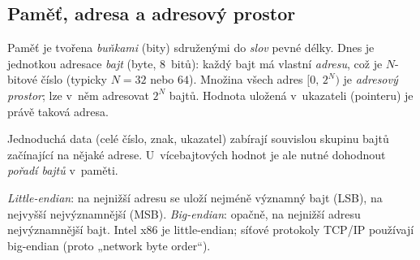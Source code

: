 \subsection{Paměť, adresa a adresový prostor}

\begin{definice}
Paměť je tvořena \emph{buňkami} (bity) sdruženými do \emph{slov} pevné délky. Dnes je jednotkou adresace \emph{bajt} (byte, 8~bitů): každý bajt má vlastní \emph{adresu}, což je $N$-bitové číslo (typicky $N=32$ nebo $64$). Množina všech adres $[0,\,2^{N})$ je \emph{adresový prostor}; lze v~něm adresovat $2^{N}$ bajtů. Hodnota uložená v~ukazateli (pointeru) je právě taková adresa.
\end{definice}

Jednoduchá data (celé číslo, znak, ukazatel) zabírají souvislou skupinu bajtů začínající na nějaké adrese. U~vícebajtových hodnot je ale nutné dohodnout \emph{pořadí bajtů} v~paměti.

\begin{definice}
\emph{Little-endian}: na nejnižší adresu se uloží nejméně významný bajt (LSB), na nejvyšší nejvýznamnější (MSB). \emph{Big-endian}: opačně, na nejnižší adresu nejvýznamnější bajt. Intel x86 je little-endian; síťové protokoly TCP/IP používají big-endian (proto „network byte order``).
\end{definice}

\begin{center}
%
\end{center}

